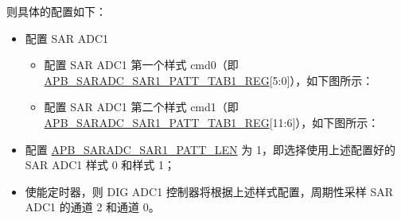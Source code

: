 \documentclass[main\_\_CN.tex]{subfiles}
\begin{document}
则具体的配置如下：
\begin{itemize}
    \item 配置 SAR ADC1
    \begin{itemize}
        \item 配置 SAR ADC1 第一个样式 cmd0（即 \hyperref[regdesc:APBSARADCSAR1PATTTAB1REG]{APB\_SARADC\_SAR1\_PATT\_TAB1\_REG}[5:0]），如下图所示：

\centering
{}%
%
\reglabel{}\regnewline%
\begin{regdesc}\end{regdesc}
\end{itemize}

\begin{itemize}
    \item 配置 SAR ADC1 第二个样式 cmd1（即 \hyperref[regdesc:APBSARADCSAR1PATTTAB1REG]{APB\_SARADC\_SAR1\_PATT\_TAB1\_REG}[11:6]），如下图所示：

\centering
{}%
%
\reglabel{}\regnewline%
\begin{regdesc}\end{regdesc}
\end{itemize}
\end{itemize}




\begin{itemize}
    \item 配置 \hyperref[fielddesc:APBSARADCSAR1PATTLEN]{APB\_SARADC\_SAR1\_PATT\_LEN} 为 1，即选择使用上述配置好的 SAR ADC1 样式 0 和样式 1；
    \item 使能定时器，则 DIG ADC1 控制器将根据上述样式配置，周期性采样 SAR ADC1 的通道 2 和通道 0。
\end{itemize}
\end{document}
